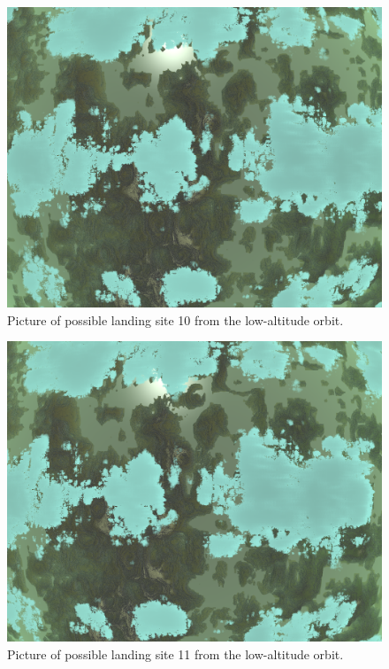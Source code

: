 \documentclass[reprint,english,notitlepage]{revtex4-2}
\begin{document}
    \begin{figure}[h]
        \centering
        \includegraphics[scale=0.14]{Figures/l_site10}
        \caption{Picture of possible landing site 10 from the low-altitude orbit.}\label{fig:l_site10}
    \end{figure}
    \begin{figure}[h]
        \centering
        \includegraphics[scale=0.14]{Figures/l_site11}
        \caption{Picture of possible landing site 11 from the low-altitude orbit.}\label{fig:l_site11}
    \end{figure}
\end{document}
